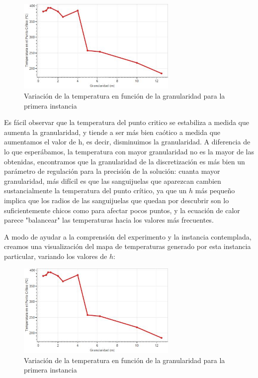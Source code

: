 \begin{figure}[h]
    \centering
    \includegraphics[width=0.685\textwidth]{experimento 1-1}
    \caption{Variación de la temperatura en función de la granularidad para la primera instancia}
    \label{fig:exp11}
\end{figure}

Es fácil observar que la temperatura del punto critico se estabiliza a medida que aumenta la granularidad, y tiende a ser más bien caótico a medida que aumentamos el valor de h, es decir, disminuimos la granularidad. A diferencia de lo que esperábamos, la temperatura con mayor granularidad no es la mayor de las obtenidas, encontramos que la granularidad de la discretización es más bien un parámetro de regulación para la precisión de la solución: cuanta mayor granularidad, más difícil es que las sanguijuelas que aparezcan cambien sustancialmente la temperatura del punto crítico, ya que un $h$ más pequeño implica que los radios de las sanguijuelas que quedan por descubrir son lo suficientemente chicos como para afectar pocos puntos, y la ecuación de calor parece "balancear" las temperaturas hacia los valores más frecuentes.

A modo de ayudar a la comprensión del experimento y la instancia contemplada, creamos una visualización del mapa de temperaturas generado por esta instancia particular, variando los valores de $h$:

\begin{figure}[h]
    \centering
    \includegraphics[width=0.685\textwidth]{experimento 1-1}
    \caption{Variación de la temperatura en función de la granularidad para la primera instancia}
    \label{fig:exp11}
\end{figure}

